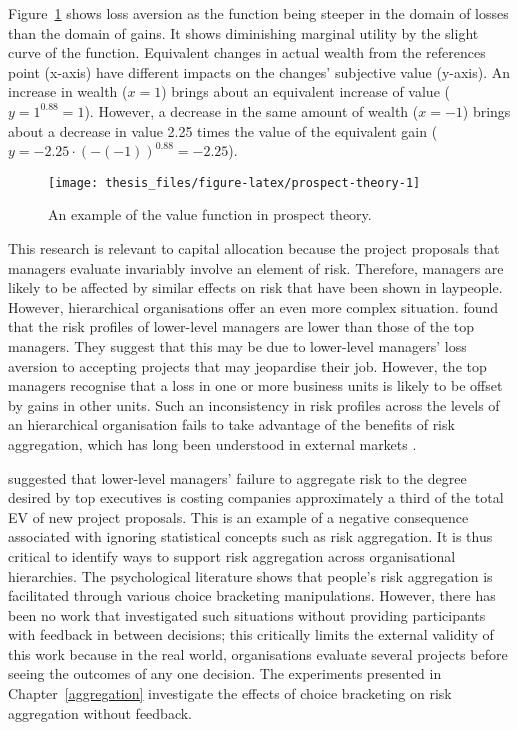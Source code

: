 \documentclass[a4paper, nobind]{templates/ociamthesis}
\theoremstyle{definition}
\theoremstyle{definition}
\theoremstyle{definition}
\theoremstyle{definition}
\theoremstyle{remark}
\begin{document}
Figure~\ref{fig:prospect-theory} shows loss aversion as the function being
steeper in the domain of losses than the domain of gains. It shows diminishing
marginal utility by the slight curve of the function. Equivalent changes in
actual wealth from the references point (x-axis) have different impacts on the
changes' subjective value (y-axis). An increase in wealth (\(x = 1\)) brings about
an equivalent increase of value (\(y = 1^{0.88} = 1\)). However, a decrease in the
same amount of wealth (\(x = -1\)) brings about a decrease in value 2.25 times the
value of the equivalent gain (\(y = -2.25 \cdot (-(-1))^{0.88} = -2.25\)).



\begin{figure}
\texttt{[image: thesis\_files/figure-latex/prospect-theory-1]} \caption{An example of the value function in prospect theory.}\label{fig:prospect-theory}
\end{figure}

This research is relevant to capital allocation because the project proposals
that managers evaluate invariably involve an element of risk. Therefore,
managers are likely to be affected by similar effects on risk that have been
shown in laypeople. However, hierarchical organisations offer an even more
complex situation. \textcite{lovallo2020} found that the risk profiles of lower-level
managers are lower than those of the top managers. They suggest that this may be
due to lower-level managers' loss aversion to accepting projects that may
jeopardise their job. However, the top managers recognise that a loss in one or
more business units is likely to be offset by gains in other units. Such an
inconsistency in risk profiles across the levels of an hierarchical organisation
fails to take advantage of the benefits of risk aggregation, which has long been
understood in external markets \autocite{markowitz1952}.

\textcite{lovallo2020} suggested that lower-level managers' failure to aggregate risk to
the degree desired by top executives is costing companies approximately a third
of the total EV of new project proposals. This is an example of a negative
consequence associated with ignoring statistical concepts such as risk
aggregation. It is thus critical to identify ways to support risk aggregation
across organisational hierarchies. The psychological literature shows that
people's risk aggregation is facilitated through various choice bracketing
manipulations. However, there has been no work that investigated such situations
without providing participants with feedback in between decisions; this
critically limits the external validity of this work because in the real world,
organisations evaluate several projects before seeing the outcomes of any one
decision. The experiments presented in Chapter~\ref{aggregation} investigate
the effects of choice bracketing on risk aggregation without feedback.
\end{document}
